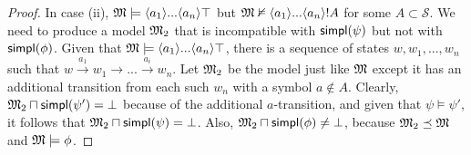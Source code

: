 \begin{proof}
In case (ii), $\frak{M} \models \langle a_1 \rangle ... \langle a_n \rangle
\top$ but $\frak{M} \nvDash \langle a_1 \rangle ... \langle a_n \rangle !A$
for some $A \subset \mathcal{S}$. We need to produce a model $\frak{M}_2$ that
is incompatible with $\mathsf{simpl}(\psi)$ but not with $\mathsf{simpl}(\phi)$. Given that
$\frak{M} \models \langle a_1 \rangle ... \langle a_n \rangle \top$, there is
a sequence of states $w, w_1, ..., w_n$ such that $w \xrightarrow{a_1}
w_1 \rightarrow ... \xrightarrow{a_i} w_n$. Let $\frak{M}_2$ be the model just
like $\frak{M}$ except it has an additional transition from each such $w_n$
with a symbol $a \notin A$. 
Clearly, $\frak{M}_2 \sqcap \mathsf{simpl}(\psi') = \bot$
because of the additional $a$-transition, and given that $\psi \models
\psi'$, it follows that $\frak{M}_2 \sqcap \mathsf{simpl}(\psi) = \bot$. Also, $\frak{M}_2 \sqcap
\mathsf{simpl}(\phi) \neq \bot$, because $\frak{M}_2 \preceq \frak{M}$ and $\frak{M} \models \phi$.


\end{proof}
